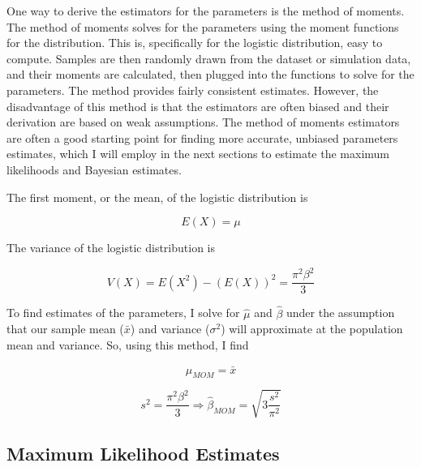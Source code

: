 \documentclass{svproc}
\begin{document}
One way to derive the estimators for the parameters is the method of moments. The method of moments solves for the parameters using the moment functions for the distribution. This is, specifically for the logistic distribution, easy to compute. Samples are then randomly drawn from the dataset or simulation data, and their moments are calculated, then plugged into the functions to solve for the parameters. The method provides fairly consistent estimates. However, the disadvantage of this method is that the estimators are often biased and their derivation are based on weak assumptions. The method of moments estimators are often a good starting point for finding more accurate, unbiased parameters estimates, which I will employ in the next sections to estimate the maximum likelihoods and Bayesian estimates.  

The first moment, or the mean, of the logistic distribution is 

\begin{equation}
E(X) = \mu 
\label{2.8}
\end{equation}

The variance of the logistic distribution is

\begin{equation}
V(X) = E(X^2) - (E(X))^2 = \frac{\pi^2 \beta^2}{3}
\label{2.9}
\end{equation}

To find estimates of the parameters, I solve for $\hat{\mu}$ and $\hat{\beta}$ under the assumption that our sample mean ($\bar{x}$) and variance ($\sigma^2$) will approximate at the population mean and variance. So, using this method, I find 

\begin{equation}
\hat{\mu}_{MOM} = \bar{x} 
\label{2.10}
\end{equation}

\begin{equation}
s^2 = \frac{\pi^2 \beta^2}{3} \Rightarrow \hat{\beta}_{MOM} = \sqrt{3 \frac{s^2}{\pi^2}}
\label{2.11}
\end{equation}

\subsection{Maximum Likelihood Estimates}
\end{document}
